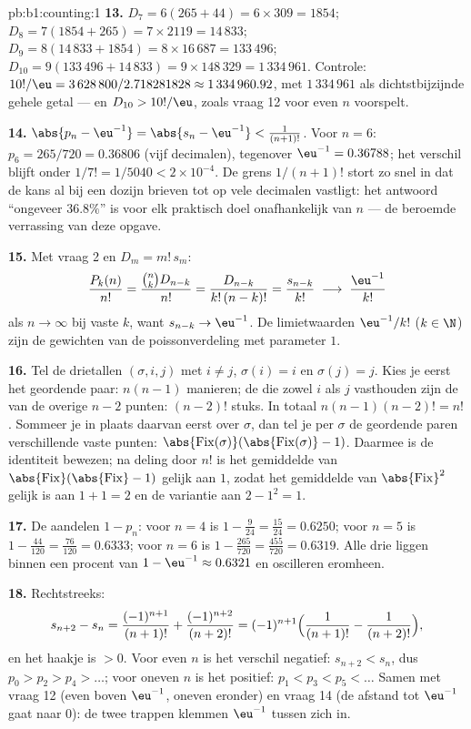 \begin{solution}{pb:b1:counting:1}
\textbf{13.} $D_7 = 6(265 + 44) = 6 \times 309 = 1854$; $D_8 = 7(1854 +
265) = 7 \times 2119 = 14\,833$; $D_9 = 8(14\,833 + 1854) = 8 \times
16\,687 = 133\,496$; $D_{10} = 9(133\,496 + 14\,833) = 9 \times 148\,329
= 1\,334\,961$. Controle: $10!/\eu = 3\,628\,800 / 2.718281828 \approx
1\,334\,960.92$, met $1\,334\,961$ als dichtstbijzijnde gehele getal ---
en $D_{10} > 10!/\eu$, zoals vraag 12 voor even $n$ voorspelt.

\textbf{14.} $\abs{p_n - \eu^{-1}} = \abs{s_n - \eu^{-1}} <
\frac1{(n+1)!}$. Voor $n = 6$: $p_6 = 265/720 = 0.36806$ (vijf
decimalen), tegenover $\eu^{-1} = 0.36788$; het verschil blijft onder
$1/7! = 1/5040 < 2 \times 10^{-4}$. De grens $1/(n+1)!$ stort zo snel in
dat de kans al bij een dozijn brieven tot op vele decimalen vastligt: het
antwoord ``ongeveer $36.8\%$'' is voor elk praktisch doel onafhankelijk
van $n$ --- de beroemde verrassing van deze opgave.

\textbf{15.} Met vraag 2 en $D_m = m!\,s_m$:
\[
\frac{P_k(n)}{n!} = \frac{\binom nk D_{n-k}}{n!}
= \frac{D_{n-k}}{k!\,(n-k)!} = \frac{s_{n-k}}{k!}
\;\longrightarrow\; \frac{\eu^{-1}}{k!}
\]
als $n \to \infty$ bij vaste $k$, want $s_{n-k} \to \eu^{-1}$. De
limietwaarden $\eu^{-1}/k!$ ($k \in \N$) zijn de gewichten van de
poissonverdeling met parameter $1$.

\textbf{16.} Tel de drietallen $(\sigma, i, j)$ met $i \neq j$,
$\sigma(i) = i$ en $\sigma(j) = j$. Kies je eerst het geordende paar:
$n(n-1)$ manieren; de  die zowel $i$ als $j$ vasthouden zijn
de  van de overige $n - 2$ punten: $(n-2)!$ stuks. In totaal
$n(n-1)(n-2)! = n!$. Sommeer je in plaats daarvan eerst over $\sigma$,
dan tel je per $\sigma$ de geordende paren verschillende vaste punten:
$\abs{\mathrm{Fix}(\sigma)}(\abs{\mathrm{Fix}(\sigma)}-1)$. Daarmee is de
identiteit bewezen; na deling door $n!$ is het gemiddelde van
$\abs{\mathrm{Fix}}(\abs{\mathrm{Fix}} - 1)$ gelijk aan $1$, zodat het
gemiddelde van $\abs{\mathrm{Fix}}^2$ gelijk is aan $1 + 1 = 2$ en de
variantie aan $2 - 1^2 = 1$.

\textbf{17.} De aandelen $1 - p_n$: voor $n = 4$ is $1 - \frac 9{24} =
\frac{15}{24} = 0.6250$; voor $n = 5$ is $1 - \frac{44}{120} =
\frac{76}{120} = 0.6333$; voor $n = 6$ is $1 - \frac{265}{720} =
\frac{455}{720} = 0.6319$. Alle drie liggen binnen een procent van $1 -
\eu^{-1} \approx 0.6321$ en oscilleren eromheen.

\textbf{18.} Rechtstreeks:
\[
s_{n+2} - s_n = \frac{(-1)^{n+1}}{(n+1)!} +
\frac{(-1)^{n+2}}{(n+2)!}
= (-1)^{n+1}\Bigl(\frac1{(n+1)!} - \frac1{(n+2)!}\Bigr),
\]
en het haakje is $> 0$. Voor even $n$ is het verschil negatief:
$s_{n+2} < s_n$, dus $p_0 > p_2 > p_4 > \dots$; voor oneven $n$ is het
positief: $p_1 < p_3 < p_5 < \dots$ Samen met vraag 12 (even boven
$\eu^{-1}$, oneven eronder) en vraag 14 (de afstand tot $\eu^{-1}$ gaat
naar $0$): de twee trappen klemmen $\eu^{-1}$ tussen zich in.


\end{solution}
